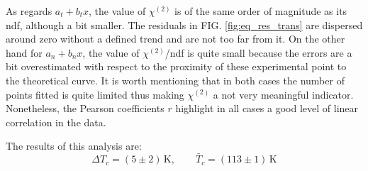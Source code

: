\documentclass[rmp,10pt,onecolumn,fleqn,notitlepage]{revtex4-1}
\begin{document}
As regards $a_t + b_t x$, the value of $\chi^{(2)}$ is of the same order of magnitude as its ndf, although a bit smaller. The residuals in FIG. \ref{fig:eq_res_trans} are dispersed around zero without a defined trend and are not too far from it.   
On the other hand for $a_n + b_n x$, the value of $\chi^{(2)}$/ndf is quite small because the errors are a bit overestimated with respect to the proximity of these experimental point to the theoretical curve. It is worth mentioning that in both cases the number of points fitted is quite limited thus making $\chi^{(2)}$ a not very meaningful indicator. Nonetheless, the Pearson coefficients $r$ highlight in all cases a good level of linear correlation in the data.

The results of this analysis are:
\begin{equation*}
    \Delta T_c = (5 \pm 2)\, \si{\kelvin}, \qquad  \bar{T}_c = (113 \pm 1) \, \si{\kelvin}
\end{equation*}

\pagebreak 
\end{document}
